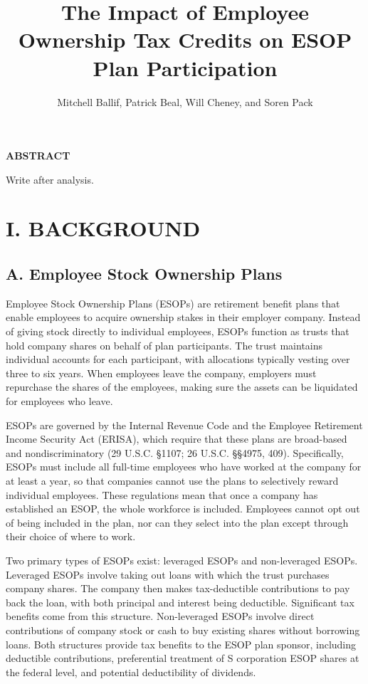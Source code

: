 \documentclass[12pt]{article}
\title{\normalsize The Impact of Employee Ownership Tax Credits on ESOP Plan Participation}
\author{\normalsize Mitchell Ballif, Patrick Beal, Will Cheney, and Soren Pack}
\date{}
\renewcommand{\normalsize}{\fontsize{12pt}{14pt}\selectfont}
\begin{document}
\maketitle

\begin{center}
\normalsize \textbf{ABSTRACT}
\end{center}

Write after analysis.

\vspace{12pt}

\renewcommand{\thesection}{\Roman{section}}
\renewcommand{\thesubsection}{\Roman{subsection}}

\section*{\centering \normalsize \textbf{I. BACKGROUND}}

\subsection*{A. Employee Stock Ownership Plans}

Employee Stock Ownership Plans (ESOPs) are retirement benefit plans that enable employees to acquire ownership stakes in their employer company. Instead of giving stock directly to individual employees, ESOPs function as trusts that hold company shares on behalf of plan participants. The trust maintains individual accounts for each participant, with allocations typically vesting over three to six years. When employees leave the company, employers must repurchase the shares of the employees, making sure the assets can be liquidated for employees who leave.

ESOPs are governed by the Internal Revenue Code and the Employee Retirement Income Security Act (ERISA), which require that these plans are broad-based and nondiscriminatory (29 U.S.C. \S 1107; 26 U.S.C. \S\S 4975, 409). Specifically, ESOPs must include all full-time employees who have worked at the company for at least a year, so that companies cannot use the plans to selectively reward individual employees. These regulations mean that once a company has established an ESOP, the whole workforce is included. Employees cannot opt out of being included in the plan, nor can they select into the plan except through their choice of where to work.

Two primary types of ESOPs exist: leveraged ESOPs and non-leveraged ESOPs. Leveraged ESOPs involve taking out loans with which the trust purchases company shares. The company then makes tax-deductible contributions to pay back the loan, with both principal and interest being deductible. Significant tax benefits come from this structure. Non-leveraged ESOPs involve direct contributions of company stock or cash to buy existing shares without borrowing loans. Both structures provide tax benefits to the ESOP plan sponsor, including deductible contributions, preferential treatment of S corporation ESOP shares at the federal level, and potential deductibility of dividends.
\end{document}

